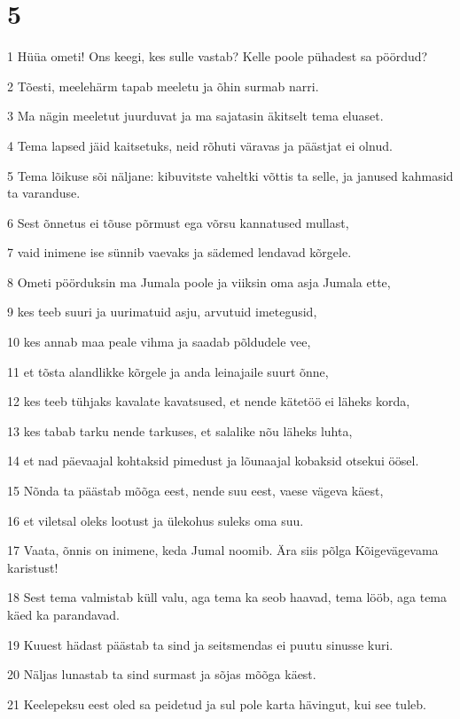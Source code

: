 \chapter{5}

\par 1 Hüüa ometi! Ons keegi, kes sulle vastab? Kelle poole pühadest sa pöördud?
\par 2 Tõesti, meelehärm tapab meeletu ja õhin surmab narri.
\par 3 Ma nägin meeletut juurduvat ja ma sajatasin äkitselt tema eluaset.
\par 4 Tema lapsed jäid kaitsetuks, neid rõhuti väravas ja päästjat ei olnud.
\par 5 Tema lõikuse sõi näljane: kibuvitste vaheltki võttis ta selle, ja janused kahmasid ta varanduse.
\par 6 Sest õnnetus ei tõuse põrmust ega võrsu kannatused mullast,
\par 7 vaid inimene ise sünnib vaevaks ja sädemed lendavad kõrgele.
\par 8 Ometi pöörduksin ma Jumala poole ja viiksin oma asja Jumala ette,
\par 9 kes teeb suuri ja uurimatuid asju, arvutuid imetegusid,
\par 10 kes annab maa peale vihma ja saadab põldudele vee,
\par 11 et tõsta alandlikke kõrgele ja anda leinajaile suurt õnne,
\par 12 kes teeb tühjaks kavalate kavatsused, et nende kätetöö ei läheks korda,
\par 13 kes tabab tarku nende tarkuses, et salalike nõu läheks luhta,
\par 14 et nad päevaajal kohtaksid pimedust ja lõunaajal kobaksid otsekui öösel.
\par 15 Nõnda ta päästab mõõga eest, nende suu eest, vaese vägeva käest,
\par 16 et viletsal oleks lootust ja ülekohus suleks oma suu.
\par 17 Vaata, õnnis on inimene, keda Jumal noomib. Ära siis põlga Kõigevägevama karistust!
\par 18 Sest tema valmistab küll valu, aga tema ka seob haavad, tema lööb, aga tema käed ka parandavad.
\par 19 Kuuest hädast päästab ta sind ja seitsmendas ei puutu sinusse kuri.
\par 20 Näljas lunastab ta sind surmast ja sõjas mõõga käest.
\par 21 Keelepeksu eest oled sa peidetud ja sul pole karta hävingut, kui see tuleb.
